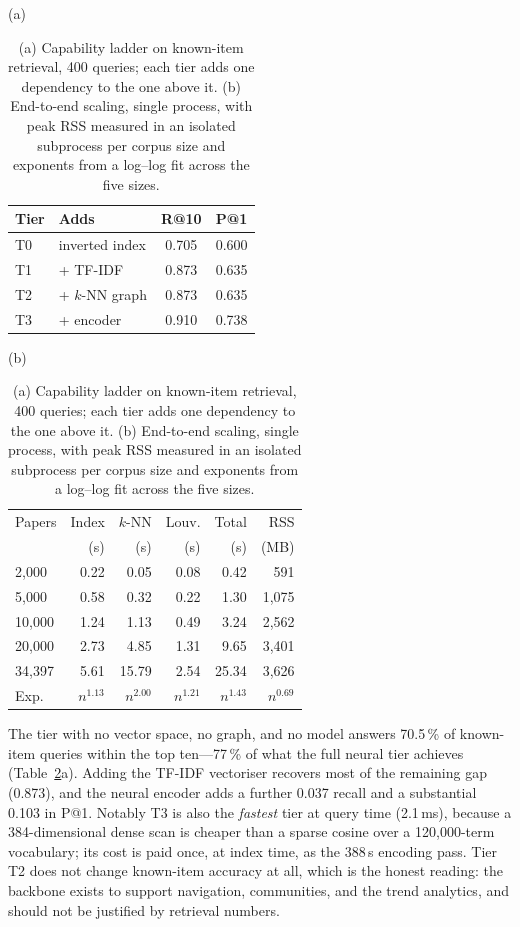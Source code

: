 \documentclass[runningheads]{llncs}
\begin{document}
\begin{table}[htbp]
\centering\small
\caption{(a) Capability ladder on known-item retrieval, 400 queries; each tier adds one
dependency to the one above it. (b) End-to-end scaling, single process, with peak RSS
measured in an isolated subprocess per corpus size and exponents from a log--log fit
across the five sizes.}
\label{tab:ladder}
\begin{minipage}[t]{0.415\textwidth}
\centering
(a)\\[2pt]
\begin{tabular}{llcc}
\toprule
Tier & Adds & R@10 & P@1 \\
\midrule
T0 & inverted index   & 0.705 & 0.600 \\
T1 & + TF-IDF         & 0.873 & 0.635 \\
T2 & + $k$-NN graph   & 0.873 & 0.635 \\
T3 & + encoder        & 0.910 & 0.738 \\
\bottomrule
\end{tabular}
\end{minipage}\hfill
\begin{minipage}[t]{0.575\textwidth}
\centering
(b)\\[2pt]
\setlength{\tabcolsep}{3.4pt}
\begin{tabular}{lrrrrr}
\toprule
Papers & Index & $k$-NN & Louv. & Total & RSS \\
       & (s) & (s) & (s) & (s) & (MB) \\
\midrule
2{,}000  & 0.22 & 0.05  & 0.08 & 0.42  & 591 \\
5{,}000  & 0.58 & 0.32  & 0.22 & 1.30  & 1{,}075 \\
10{,}000 & 1.24 & 1.13  & 0.49 & 3.24  & 2{,}562 \\
20{,}000 & 2.73 & 4.85  & 1.31 & 9.65  & 3{,}401 \\
34{,}397 & 5.61 & 15.79 & 2.54 & 25.34 & 3{,}626 \\
\midrule
Exp. & $n^{1.13}$ & $n^{2.00}$ & $n^{1.21}$ & $n^{1.43}$ & $n^{0.69}$ \\
\bottomrule
\end{tabular}
\end{minipage}
\end{table}

The tier with no vector space, no graph, and no model answers 70.5\,\% of known-item
queries within the top ten---77\,\% of what the full neural tier achieves
(Table~\ref{tab:ladder}a). Adding the TF-IDF vectoriser recovers most of the remaining
gap (0.873), and the neural encoder adds a further 0.037 recall and a substantial
0.103 in P@1. Notably T3 is also the \emph{fastest} tier at query time (2.1\,ms),
because a 384-dimensional dense scan is cheaper than a sparse cosine over a
120{,}000-term vocabulary; its cost is paid once, at index time, as the 388\,s
encoding pass. Tier T2 does not change known-item accuracy at all, which is the honest reading: the backbone exists to support navigation, communities, and the
trend analytics, and should not be justified by retrieval numbers.
\end{document}

